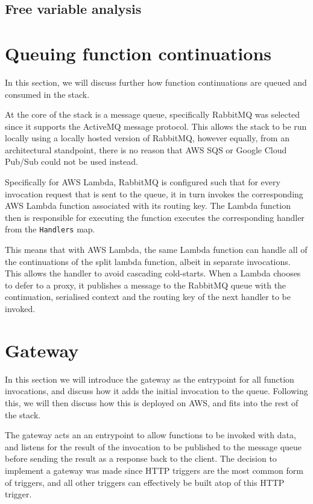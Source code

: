 \subsection{Free variable analysis}

\section{Queuing function continuations}
In this section, we will discuss further how function continuations are queued and consumed in the \faaas{} stack.

At the core of the \faaas{} stack is a message queue, specifically RabbitMQ was selected since it supports the ActiveMQ message protocol. This allows the \faaas{} stack to be run locally using a locally hosted version of RabbitMQ, however equally, from an architectural standpoint, there is no reason that AWS SQS or Google Cloud Pub/Sub could not be used instead.

Specifically for AWS Lambda, RabbitMQ is configured such that for every invocation request that is sent to the queue, it in turn invokes the corresponding AWS Lambda function associated with its routing key. The Lambda function then is responsible for executing the function executes the corresponding handler from the \verb|Handlers| map.

This means that with AWS Lambda, the same Lambda function can handle all of the continuations of the split lambda function, albeit in separate invocations. This allows the handler to avoid cascading cold-starts. When a Lambda chooses to defer to a proxy, it publishes a message to the RabbitMQ queue with the continuation, serialised context and the routing key of the next handler to be invoked.

\section{Gateway}
In this section we will introduce the gateway as the entrypoint for all function invocations, and discuss how it adds the initial invocation to the queue. Following this, we will then discuss how this is deployed on AWS, and fits into the rest of the stack.

The gateway acts an an entrypoint to allow functions to be invoked with data, and listens for the result of the invocation to be published to the message queue before sending the result as a response back to the client. The decision to implement a gateway was made since HTTP triggers are the most common form of triggers\cite{eismannReviewServerlessUse2020}, and all other triggers can effectively be built atop of this HTTP trigger.

